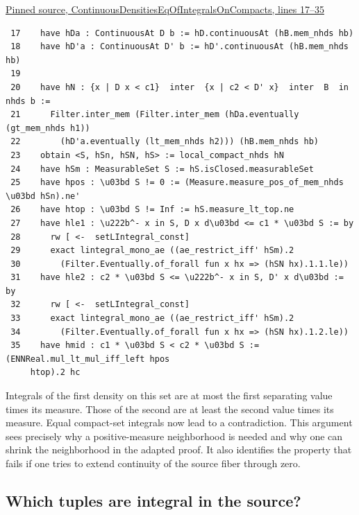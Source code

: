 \documentclass[12pt,letterpaper]{article}
\begin{document}
\par\smallskip\href{https://github.com/nousentllc/riemann-hypothesis/blob/40e56bab026552e089d7afcfeff08d2defb9c005/src/CompanionTheory/SpectralGeometry/LocalGlobalProofs/AdelicAnalysis/ContinuousDensitiesEqOfIntegralsOnCompacts.lean#L17-L35}{\sffamily\small Pinned source, ContinuousDensitiesEqOfIntegralsOnCompacts, lines 17--35}\par

{\footnotesize\begin{verbatim}
 17    have hDa : ContinuousAt D b := hD.continuousAt (hB.mem_nhds hb)
 18    have hD'a : ContinuousAt D' b := hD'.continuousAt (hB.mem_nhds hb)
 19  
 20    have hN : {x | D x < c1}  inter  {x | c2 < D' x}  inter  B  in  nhds b :=
 21      Filter.inter_mem (Filter.inter_mem (hDa.eventually (gt_mem_nhds h1))
 22        (hD'a.eventually (lt_mem_nhds h2))) (hB.mem_nhds hb)
 23    obtain <S, hSn, hSN, hS> := local_compact_nhds hN
 24    have hSm : MeasurableSet S := hS.isClosed.measurableSet
 25    have hpos : \u03bd S != 0 := (Measure.measure_pos_of_mem_nhds \u03bd hSn).ne'
 26    have htop : \u03bd S != Inf := hS.measure_lt_top.ne
 27    have hle1 : \u222b^- x in S, D x d\u03bd <= c1 * \u03bd S := by
 28      rw [ <-  setLIntegral_const]
 29      exact lintegral_mono_ae ((ae_restrict_iff' hSm).2
 30        (Filter.Eventually.of_forall fun x hx => (hSN hx).1.1.le))
 31    have hle2 : c2 * \u03bd S <= \u222b^- x in S, D' x d\u03bd := by
 32      rw [ <-  setLIntegral_const]
 33      exact lintegral_mono_ae ((ae_restrict_iff' hSm).2
 34        (Filter.Eventually.of_forall fun x hx => (hSN hx).1.2.le))
 35    have hmid : c1 * \u03bd S < c2 * \u03bd S := (ENNReal.mul_lt_mul_iff_left hpos
     htop).2 hc
\end{verbatim}
}

Integrals of the first density on this set are at most the first separating value times its measure. Those of the second are at least the second value times its measure. Equal compact-set integrals now lead to a contradiction. This argument sees precisely why a positive-measure neighborhood is needed and why one can shrink the neighborhood in the adapted proof. It also identifies the property that fails if one tries to extend continuity of the source fiber through zero.

\clearpage\subsection*{Which tuples are integral in the source?}
\end{document}
